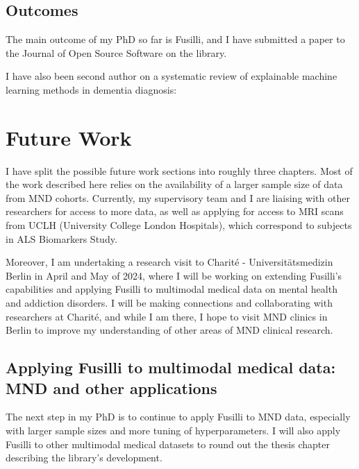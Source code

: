 \subsection{Outcomes}

The main outcome of my PhD so far is Fusilli, and I have submitted a paper to the Journal of Open Source Software on the library.


I have also been second author on a systematic review of explainable machine learning methods in dementia diagnosis:


\section{Future Work}

I have split the possible future work sections into roughly three chapters.
Most of the work described here relies on the availability of a larger sample size of data from MND cohorts.
Currently, my supervisory team and I are liaising with other researchers for access to more data, as well as applying for access to MRI scans from UCLH (University College London Hospitals), which correspond to subjects in ALS Biomarkers Study.

Moreover, I am undertaking a research visit to Charité - Universitätsmedizin Berlin in April and May of 2024, where I will be working on extending Fusilli's capabilities and applying Fusilli to multimodal medical data on mental health and addiction disorders.
I will be making connections and collaborating with researchers at Charité, and while I am there, I hope to visit MND clinics in Berlin to improve my understanding of other areas of MND clinical research.

\subsection{Applying Fusilli to multimodal medical data: MND and other applications}

The next step in my PhD is to continue to apply Fusilli to MND data, especially with larger sample sizes and more tuning of hyperparameters.
I will also apply Fusilli to other multimodal medical datasets to round out the thesis chapter describing the library's development.

